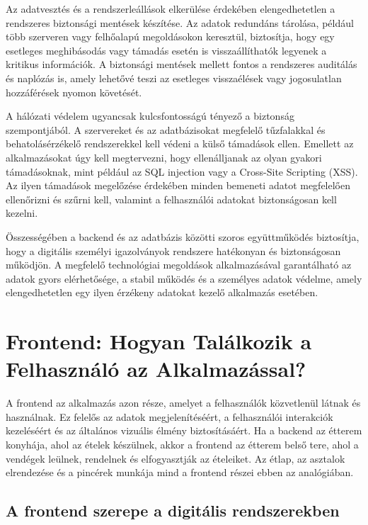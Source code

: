 \documentclass[
]{thesis-ekf}
\theoremstyle{definition}
\theoremstyle{remark}
\begin{document}
	Az adatvesztés és a rendszerleállások elkerülése érdekében elengedhetetlen a rendszeres biztonsági mentések készítése. Az adatok redundáns tárolása, például több szerveren vagy felhőalapú megoldásokon keresztül, biztosítja, hogy egy esetleges meghibásodás vagy támadás esetén is visszaállíthatók legyenek a kritikus információk. A biztonsági mentések mellett fontos a rendszeres auditálás és naplózás is, amely lehetővé teszi az esetleges visszaélések vagy jogosulatlan hozzáférések nyomon követését.
	
	A hálózati védelem ugyancsak kulcsfontosságú tényező a biztonság szempontjából. A szervereket és az adatbázisokat megfelelő tűzfalakkal és behatolásérzékelő rendszerekkel kell védeni a külső támadások ellen. Emellett az alkalmazásokat úgy kell megtervezni, hogy ellenálljanak az olyan gyakori támadásoknak, mint például az SQL injection vagy a Cross-Site Scripting (XSS). Az ilyen támadások megelőzése érdekében minden bemeneti adatot megfelelően ellenőrizni és szűrni kell, valamint a felhasználói adatokat biztonságosan kell kezelni.
	
	Összességében a backend és az adatbázis közötti szoros együttműködés biztosítja, hogy a digitális személyi igazolványok rendszere hatékonyan és biztonságosan működjön. A megfelelő technológiai megoldások alkalmazásával garantálható az adatok gyors elérhetősége, a stabil működés és a személyes adatok védelme, amely elengedhetetlen egy ilyen érzékeny adatokat kezelő alkalmazás esetében.
	
	\chapter{Frontend: Hogyan Találkozik a Felhasználó az Alkalmazással?}
	
	A frontend az alkalmazás azon része, amelyet a felhasználók közvetlenül látnak és használnak. Ez felelős az adatok megjelenítéséért, a felhasználói interakciók kezeléséért és az általános vizuális élmény biztosításáért. Ha a backend az étterem konyhája, ahol az ételek készülnek, akkor a frontend az étterem belső tere, ahol a vendégek leülnek, rendelnek és elfogyasztják az ételeiket. Az étlap, az asztalok elrendezése és a pincérek munkája mind a frontend részei ebben az analógiában.
	
	\section{A frontend szerepe a digitális rendszerekben}
	
\end{document}
